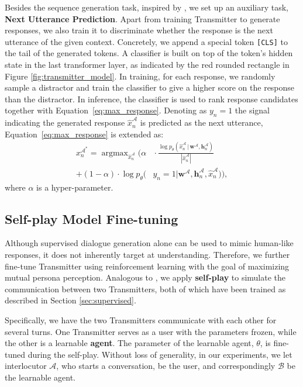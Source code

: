 \documentclass[11pt,a4paper]{article}
\begin{document}
Besides the sequence generation task, inspired by \citet{wolf2019transfertransfo}, we set up an auxiliary task, \textbf{Next Utterance Prediction}. Apart from training Transmitter to generate responses, we also train it to discriminate whether the response is the next utterance of the given context. Concretely, we append a special token \texttt{[CLS]} to the tail of the generated tokens. A classifier is built on top of the token's hidden state in the last transformer layer, as indicated by the red rounded rectangle in Figure \ref{fig:transmitter_model}. In training, for each response, we randomly sample a distractor and train the classifier to give a higher score on the response than the distractor. In inference, the classifier is used to rank response candidates together with Equation~\ref{eq:max_response}. Denoting as $y_n=1$ the signal indicating the generated response $\hat{x}^{\mathcal{A}}_n$ is predicted as the next utterance, Equation~\ref{eq:max_response} is extended as:
\begin{equation}\label{eq:final_score}
\begin{aligned}
     x^{\mathcal{A}^*}_{n}=\mathop{\arg\max}_{\hat{x}^{\mathcal{A}}_{n}}\bigg(\alpha&\!\cdot \frac{\log p_{\theta}(\hat{x}^{\mathcal{A}}_n\,|\,\mathbf{w}^{\mathcal{A}},\mathbf{h}^{\mathcal{A}}_n)}{|\hat{x}^{\mathcal{A}}_n|} \\
     + (1-\alpha)\cdot \log p_{{\theta}}(&{y_n}=1|\mathbf{w}^{\mathcal{A}},\mathbf{h}^{\mathcal{A}}_n,\hat{x}^{\mathcal{A}}_n)\bigg),
\end{aligned}
\end{equation}
where $\alpha$ is a hyper-parameter.

\subsection{Self-play Model Fine-tuning}

Although supervised dialogue generation alone can be used to mimic human-like responses, it does not inherently target at understanding. Therefore, we further fine-tune Transmitter using reinforcement learning with the goal of maximizing mutual persona perception. Analogous to \citet{lewis2017deal}, we apply \textbf{self-play} to simulate the communication between two Transmitters, both of which have been trained as described in Section \ref{sec:supervised}. 

Specifically, we have the two Transmitters communicate with each other for several turns. One Transmitter serves as a user with the parameters frozen, while the other is a learnable \textbf{agent}. The parameter of the learnable agent, $\theta$, is fine-tuned during the self-play. Without loss of generality, in our experiments, we let interlocutor $\mathcal{A}$, who starts a conversation, be the user, and correspondingly $\mathcal{B}$ be the learnable agent.
\end{document}
